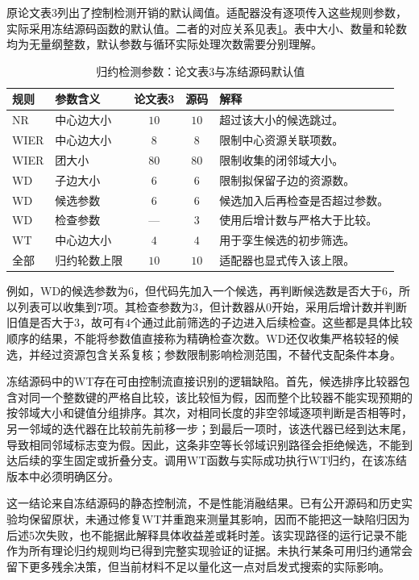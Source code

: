 原论文表3列出了控制检测开销的默认阈值。适配器没有逐项传入这些规则参数，实际采用冻结源码函数的默认值。二者的对应关系见表\ref{s0304:defaults}。表中大小、数量和轮数均为无量纲整数，默认参数与循环实际处理次数需要分别理解。

\begin{table}[htbp]
 \centering
 \caption{归约检测参数：论文表3与冻结源码默认值}
 \label{s0304:defaults}
 \begin{tabularx}{\linewidth}{llccX}
  \toprule
  规则 & 参数含义 & 论文表3 & 源码 & 解释 \\
  \midrule
  NR & 中心边大小 & $10$ & $10$ & 超过该大小的候选跳过。 \\
  WIER & 中心边大小 & $8$ & $8$ & 限制中心资源关联项数。 \\
  WIER & 团大小 & $80$ & $80$ & 限制收集的闭邻域大小。 \\
  WD & 子边大小 & $6$ & $6$ & 限制拟保留子边的资源数。 \\
  WD & 候选参数 & $6$ & $6$ & 候选加入后再检查是否超过参数。 \\
  WD & 检查参数 & --- & $3$ & 使用后增计数与严格大于比较。 \\
  WT & 中心边大小 & $4$ & $4$ & 用于孪生候选的初步筛选。 \\
  全部 & 归约轮数上限 & $10$ & $10$ & 适配器也显式传入该上限。 \\
  \bottomrule
 \end{tabularx}
\end{table}

例如，WD的候选参数为$6$，但代码先加入一个候选，再判断候选数是否大于$6$，所以列表可以收集到$7$项。其检查参数为$3$，但计数器从$0$开始，采用后增计数并判断旧值是否大于$3$，故可有$4$个通过此前筛选的子边进入后续检查。这些都是具体比较顺序的结果，不能将参数值直接称为精确检查次数。WD还仅收集严格较轻的候选，并经过资源包含关系复核；参数限制影响检测范围，不替代支配条件本身。

冻结源码中的WT存在可由控制流直接识别的逻辑缺陷。首先，候选排序比较器包含对同一个整数键的严格自比较，该比较恒为假，因而整个比较器不能实现预期的按邻域大小和键值分组排序。其次，对相同长度的非空邻域逐项判断是否相等时，另一邻域的迭代器在比较前先前移一步；到最后一项时，该迭代器已经到达末尾，导致相同邻域标志变为假。因此，这条非空等长邻域识别路径会拒绝候选，不能到达后续的孪生固定或折叠分支。调用WT函数与实际成功执行WT归约，在该冻结版本中必须明确区分。

这一结论来自冻结源码的静态控制流，不是性能消融结果。已有公开源码和历史实验均保留原状，未通过修复WT并重跑来测量其影响，因而不能把这一缺陷归因为后述$5$次失败，也不能据此解释具体收益差或耗时差。该实现路径的运行记录不能作为所有理论归约规则均已得到完整实现验证的证据。未执行某条可用归约通常会留下更多残余决策，但当前材料不足以量化这一点对启发式搜索的实际影响。


